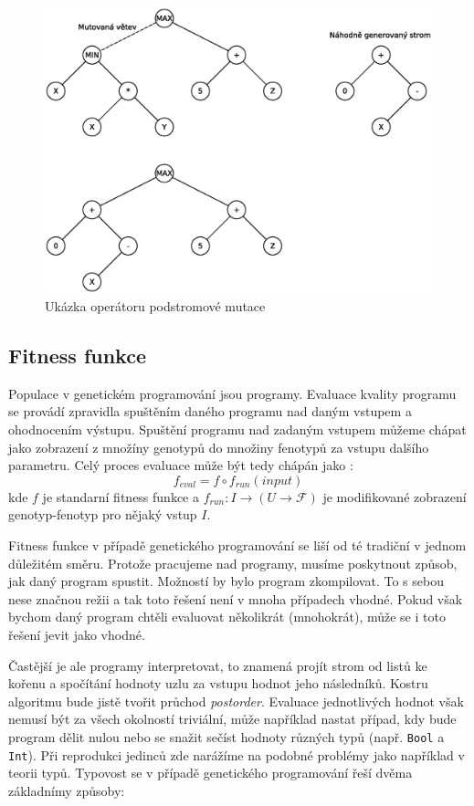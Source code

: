 \begin{figure}[!ht]
	\centering
	\includegraphics[scale=0.6]{fig/subtree_mutation}	
	\caption{Ukázka operátoru podstromové mutace}
	\label{fig:subtree_mutation}
\end{figure}

\subsection{Fitness funkce}
Populace v genetickém programování jsou programy. Evaluace kvality programu se provádí
zpravidla spuštěním daného programu nad daným vstupem a ohodnocením výstupu. Spuštění 
programu nad zadaným vstupem můžeme chápat jako zobrazení z množíny genotypů do množiny
fenotypů za vstupu dalšího parametru. Celý proces evaluace může být tedy chápán jako :
$$ f_{eval} = f \circ f_{run}(input)$$
kde $f$ je standarní fitness funkce a $f_{run} : I \to (U \to \mathcal{F})$ je
modifikované zobrazení genotyp-fenotyp pro nějaký vstup $I$.

Fitness funkce v případě genetického programování se liší od té tradiční v jednom
důležitém směru. Protože pracujeme nad programy, musíme poskytnout způsob, jak daný
program spustit. Možností by bylo program zkompilovat. To s sebou nese značnou režii
a tak toto řešení není v mnoha případech vhodné. Pokud však bychom daný program chtěli
evaluovat několikrát (mnohokrát), může se i toto řešení jevit jako vhodné.

Častější je ale programy interpretovat, to znamená projít strom od listů ke kořenu a 
spočítání hodnoty uzlu za vstupu hodnot jeho následníků. Kostru algoritmu bude jistě
tvořit průchod \textit{postorder}. Evaluace jednotlivých hodnot však nemusí být za všech 
okolností triviální, může například nastat případ, kdy bude program dělit nulou nebo
se snažit sečíst hodnoty různých typů (např. \texttt{Bool} a \texttt{Int}). Při reprodukci
jedinců zde narážíme na podobné problémy jako například v teorii typů. Typovost se v
případě genetického programování řeší dvěma základnímy způsoby:

